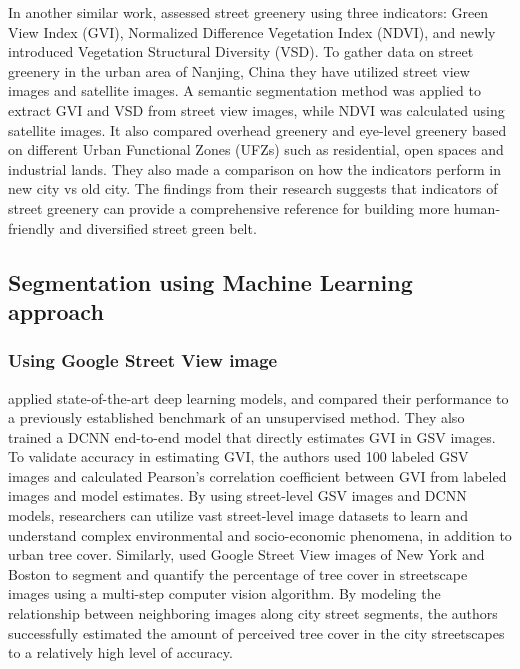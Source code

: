 In another similar work,  assessed street greenery using three indicators: Green View Index (GVI), Normalized Difference Vegetation Index (NDVI), and newly introduced Vegetation Structural Diversity (VSD). To gather data on street greenery in the urban area of Nanjing, China they have utilized street view images and satellite images. A semantic segmentation method was applied to extract GVI and VSD from street view images, while NDVI was calculated using satellite images. It also compared overhead greenery and eye-level greenery based on different Urban Functional Zones (UFZs) such as residential, open spaces and industrial lands. They also made a comparison on how the indicators perform in new city vs old city. The findings from their research suggests that indicators of street greenery  can provide a comprehensive reference for building more
human-friendly and diversified street green belt.


\subsection{Segmentation using Machine Learning approach}

\subsubsection{Using Google Street View image}
 applied state-of-the-art deep learning models,
and compared their performance to a previously established
benchmark of an unsupervised method. They also trained
a DCNN end-to-end model that directly estimates GVI in
GSV images. 
To validate accuracy in estimating GVI, 
the authors used 100 labeled GSV images and calculated Pearson’s correlation coefficient between GVI from labeled images
and model estimates.
By using street-level GSV images and DCNN models, researchers can utilize
vast street-level image datasets to learn and understand
complex environmental and socio-economic phenomena,
in addition to urban tree cover. \newline
Similarly,  used Google Street View images of New York and Boston to segment and quantify the percentage of tree cover in streetscape images using a multi-step
computer vision algorithm. By modeling the relationship between neighboring images along city street segments,
the authors successfully estimated the amount of perceived tree cover in the city
streetscapes to a relatively high level of accuracy.

